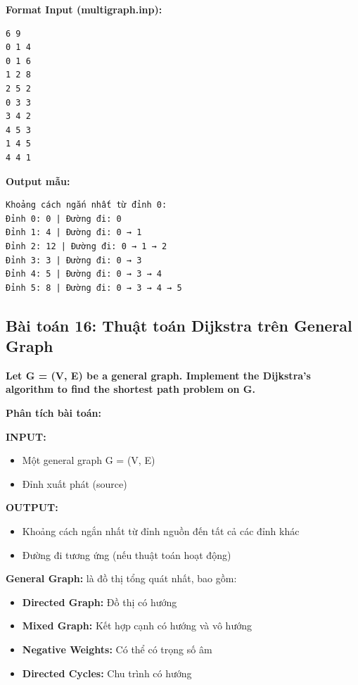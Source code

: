 \documentclass[12pt,a4paper]{article}
\begin{document}
\textbf{Format Input (multigraph.inp):}

\begin{verbatim}
6 9
0 1 4
0 1 6
1 2 8
2 5 2
0 3 3
3 4 2
4 5 3
1 4 5
4 4 1
\end{verbatim}

\textbf{Output mẫu:}
\begin{verbatim}
Khoảng cách ngắn nhất từ đỉnh 0:
Đỉnh 0: 0 | Đường đi: 0
Đỉnh 1: 4 | Đường đi: 0 → 1
Đỉnh 2: 12 | Đường đi: 0 → 1 → 2
Đỉnh 3: 3 | Đường đi: 0 → 3
Đỉnh 4: 5 | Đường đi: 0 → 3 → 4
Đỉnh 5: 8 | Đường đi: 0 → 3 → 4 → 5
\end{verbatim}

\newpage

\subsection{Bài toán 16: Thuật toán Dijkstra trên General Graph}

\begin{problembox}
    \textbf{Let G = (V, E) be a general graph. Implement the Dijkstra's algorithm to find the shortest path problem on G.}
\end{problembox}

\textbf{Phân tích bài toán:}

\textbf{INPUT:}
\begin{itemize}[label=\textbullet]
    \item Một general graph G = (V, E)
    \item Đỉnh xuất phát (source)
\end{itemize}

\textbf{OUTPUT:}
\begin{itemize}[label=\textbullet]
    \item Khoảng cách ngắn nhất từ đỉnh nguồn đến tất cả các đỉnh khác
    \item Đường đi tương ứng (nếu thuật toán hoạt động)
\end{itemize}

\textbf{General Graph:} là đồ thị tổng quát nhất, bao gồm:
\begin{itemize}[label=\textbullet]
    \item \textbf{Directed Graph:} Đồ thị có hướng
    \item \textbf{Mixed Graph:} Kết hợp cạnh có hướng và vô hướng
    \item \textbf{Negative Weights:} Có thể có trọng số âm
    \item \textbf{Directed Cycles:} Chu trình có hướng
\end{itemize}
\end{document}
